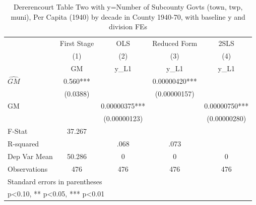 \begin{table}[htbp]\centering
\def\sym#1{\ifmmode^{#1}\else\(^{#1}\)\fi}
\caption{Dererencourt Table Two with y=Number of Subcounty Govts (town, twp, muni), Per Capita (1940) by decade in County 1940-70, with baseline y and division FEs}
\begin{tabular}{l*{4}{c}}
\toprule
                    & First Stage   &         OLS   &Reduced Form   &        2SLS   \\
                    &\multicolumn{1}{c}{(1)}&\multicolumn{1}{c}{(2)}&\multicolumn{1}{c}{(3)}&\multicolumn{1}{c}{(4)}\\
                    &\multicolumn{1}{c}{GM}&\multicolumn{1}{c}{y\_L1}&\multicolumn{1}{c}{y\_L1}&\multicolumn{1}{c}{y\_L1}\\
\midrule
$\hat{GM}$          &       0.560***&               &  0.00000420***&               \\
                    &    (0.0388)   &               &(0.00000157)   &               \\
\addlinespace
GM                  &               &  0.00000375***&               &  0.00000750***\\
                    &               &(0.00000123)   &               &(0.00000280)   \\
\midrule
F-Stat              &      37.267   &               &               &               \\
R-squared           &               &        .068   &        .073   &               \\
Dep Var Mean        &      50.286   &           0   &           0   &           0   \\
Observations        &         476   &         476   &         476   &         476   \\
\bottomrule
\multicolumn{5}{l}{\footnotesize Standard errors in parentheses}\\
\multicolumn{5}{l}{\footnotesize * p<0.10, ** p<0.05, *** p<0.01}\\
\end{tabular}
\end{table}
